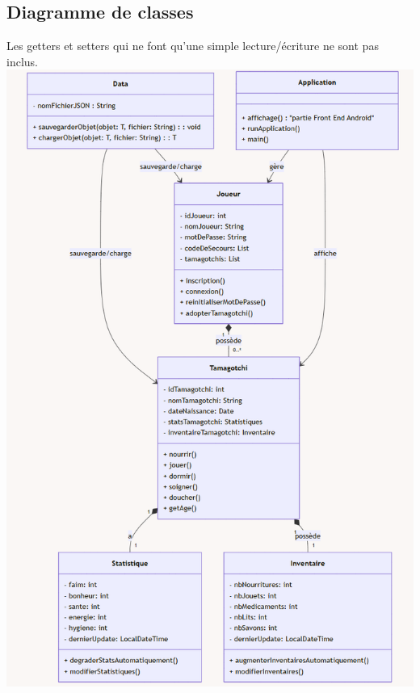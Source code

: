 \documentclass{conception_detaillee}
\begin{document}
\begin{itemize}[label=\textbullet]
\section{Diagramme de classes}
Les getters et setters qui ne font qu'une simple lecture/écriture ne sont pas inclus.
\noindent\includegraphics[width=0.8\paperwidth, height=0.8\paperheight]{images/diagramme_classe.png}

\end{itemize}
\end{document}
